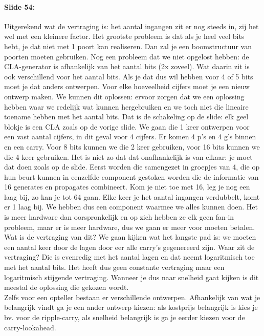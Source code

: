 \documentclass[10pt,a4paper]{book}
\begin{document}
\paragraph{Slide 54:} Uitgerekend wat de vertraging is: het aantal ingangen zit er nog steeds in, zij het wel met een kleinere factor. Het grootste probleem is dat als je heel veel bits hebt, je dat niet met 1 poort kan realiseren. Dan zal je een boomstructuur van poorten moeten gebruiken. Nog een probleem dat we niet opgelost hebben: de CLA-generator is afhankelijk van het aantal bits (2x zoveel). Wat daarin zit is ook verschillend voor het aantal bits. Als je dat dus wil hebben voor 4 of 5 bits moet je dat anders ontwerpen. Voor elke hoeveelheid cijfers moet je een nieuw ontwerp maken. We kunnen dit oplossen: ervoor zorgen dat we een oplossing hebben waar we redelijk wat kunnen hergebruiken en we toch niet die lineaire toename hebben met het aantal bits. Dat is de schakeling op de slide: elk geel blokje is een CLA zoals op de vorige slide. We gaan die 1 keer ontwerpen voor een vast aantal cijfers, in dit geval voor 4 cijfers. Er komen 4 p's en 4 g's binnen en een carry. Voor 8 bits kunnen we die 2 keer gebruiken, voor 16 bits kunnen we die 4 keer gebruiken. Het is niet zo dat dat onafhankelijk is van elkaar: je moet dat doen zoals op de slide. Eerst worden die samengezet in groepjes van 4, die op hun beurt kunnen in eenzelfde component gestoken worden die de informatie van 16 generates en propagates combineert. Kom je niet toe met 16, leg je nog een laag bij, zo kan je tot 64 gaan. Elke keer je het aantal ingangen verdubbelt, komt er 1 laag bij. We hebben dus een component waarmee we alles kunnen doen. Het is meer hardware dan oorspronkelijk en op zich hebben ze elk geen fan-in probleem, maar er is meer hardware, dus we gaan er meer voor moeten betalen. Wat is de vertraging van dit? We gaan kijken wat het langste pad is: we moeten een aantal keer door de lagen door eer alle carry's gegenereerd zijn. Waar zit de vertraging? Die is evenredig met het aantal lagen en dat neemt logaritmisch toe met het aantal bits. Het heeft dus geen constante vertraging maar een logaritmisch stijgende vertraging. Wanneer je dus naar snelheid gaat kijken is dit meestal de oplossing die gekozen wordt.\\
Zelfs voor een opteller bestaan er verschillende ontwerpen. Afhankelijk van wat je belangrijk vindt ga je een ander ontwerp kiezen: als kostprijs belangrijk is kies je bv. voor de ripple-carry, als snelheid belangrijk is ga je eerder kiezen voor de carry-lookahead.
\end{document}

